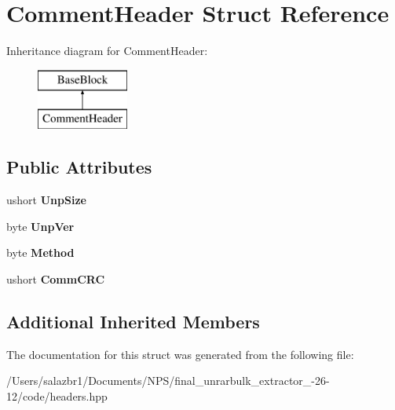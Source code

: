 \hypertarget{struct_comment_header}{\section{Comment\-Header Struct Reference}
\label{struct_comment_header}
}
Inheritance diagram for Comment\-Header\-:\begin{figure}[H]
\begin{center}
\leavevmode
\includegraphics[height=2.000000cm]{struct_comment_header}
\end{center}
\end{figure}
\subsection*{Public Attributes}
\begin{DoxyCompactItemize}
\item 
\hypertarget{struct_comment_header_aa1aeb9b48fda8a62f77a029d89da999e}{ushort {\bfseries Unp\-Size}}\label{struct_comment_header_aa1aeb9b48fda8a62f77a029d89da999e}

\item 
\hypertarget{struct_comment_header_a22b98c54ed8a00ff62687609afd309a6}{byte {\bfseries Unp\-Ver}}\label{struct_comment_header_a22b98c54ed8a00ff62687609afd309a6}

\item 
\hypertarget{struct_comment_header_a8a64cbb117d6694293f498995de77714}{byte {\bfseries Method}}\label{struct_comment_header_a8a64cbb117d6694293f498995de77714}

\item 
\hypertarget{struct_comment_header_aa356eb0314083402ded788a5e8910ca8}{ushort {\bfseries Comm\-C\-R\-C}}\label{struct_comment_header_aa356eb0314083402ded788a5e8910ca8}

\end{DoxyCompactItemize}
\subsection*{Additional Inherited Members}


The documentation for this struct was generated from the following file\-:\begin{DoxyCompactItemize}
\item 
/\-Users/salazbr1/\-Documents/\-N\-P\-S/final\-\_\-unrarbulk\-\_\-extractor\-\_-\/26-\/12/code/headers.\-hpp\end{DoxyCompactItemize}
